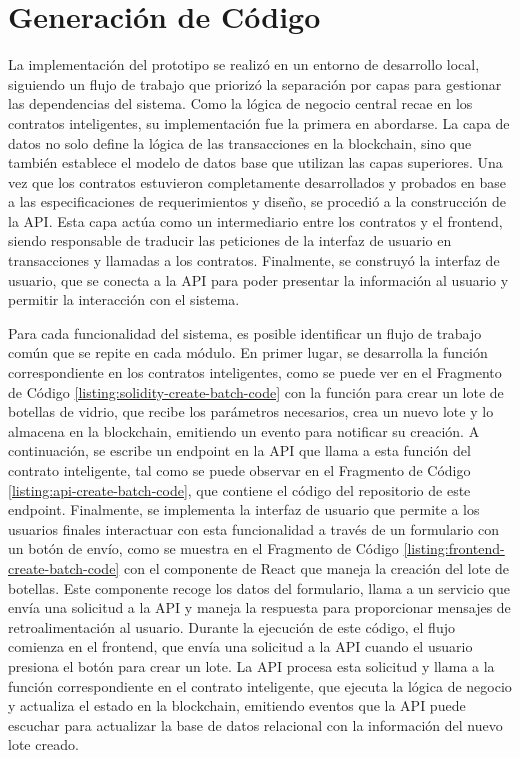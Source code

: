 \section{Generación de Código}
\label{sec:code-generation}

La implementación del prototipo se realizó en un entorno de desarrollo local, siguiendo un flujo de trabajo que priorizó la separación por capas para gestionar las dependencias del sistema. Como la lógica de negocio central recae en los contratos inteligentes, su implementación fue la primera en abordarse. La capa de datos no solo define la lógica de las transacciones en la blockchain, sino que también establece el modelo de datos base que utilizan las capas superiores. Una vez que los contratos estuvieron completamente desarrollados y probados en base a las especificaciones de requerimientos y diseño, se procedió a la construcción de la API. Esta capa actúa como un intermediario entre los contratos y el frontend, siendo responsable de traducir las peticiones de la interfaz de usuario en transacciones y llamadas a los contratos. Finalmente, se construyó la interfaz de usuario, que se conecta a la API para poder presentar la información al usuario y permitir la interacción con el sistema.

Para cada funcionalidad del sistema, es posible identificar un flujo de trabajo común que se repite en cada módulo. En primer lugar, se desarrolla la función correspondiente en los contratos inteligentes, como se puede ver en el Fragmento de Código \ref{listing:solidity-create-batch-code} con la función para crear un lote de botellas de vidrio, que recibe los parámetros necesarios, crea un nuevo lote y lo almacena en la blockchain, emitiendo un evento para notificar su creación. A continuación, se escribe un endpoint en la API que llama a esta función del contrato inteligente, tal como se puede observar en el Fragmento de Código \ref{listing:api-create-batch-code}, que contiene el código del repositorio de este endpoint. Finalmente, se implementa la interfaz de usuario que permite a los usuarios finales interactuar con esta funcionalidad a través de un formulario con un botón de envío, como se muestra en el Fragmento de Código \ref{listing:frontend-create-batch-code} con el componente de React que maneja la creación del lote de botellas. Este componente recoge los datos del formulario, llama a un servicio que envía una solicitud a la API y maneja la respuesta para proporcionar mensajes de retroalimentación al usuario. Durante la ejecución de este código, el flujo comienza en el frontend, que envía una solicitud a la API cuando el usuario presiona el botón para crear un lote. La API procesa esta solicitud y llama a la función correspondiente en el contrato inteligente, que ejecuta la lógica de negocio y actualiza el estado en la blockchain, emitiendo eventos que la API puede escuchar para actualizar la base de datos relacional con la información del nuevo lote creado. 

